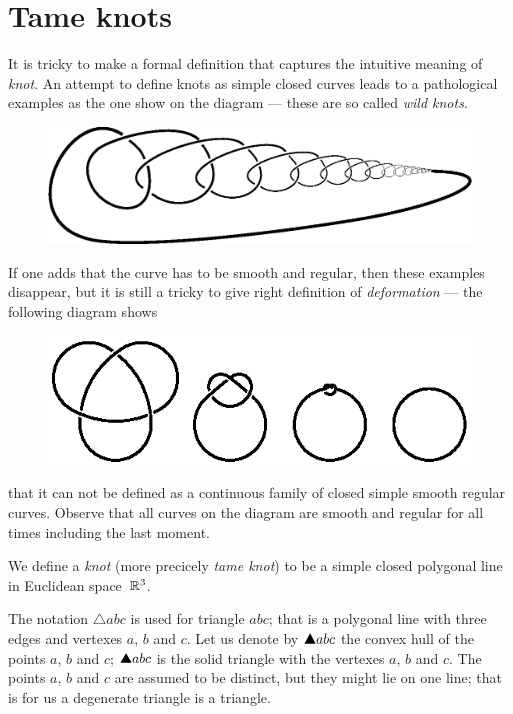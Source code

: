 \section{Tame knots}

It is tricky to make a formal definition that captures the intuitive meaning of \emph{knot}.
An attempt to define knots as simple closed curves leads to a pathological examples as the one show on the diagram --- these are so called \emph{wild knots}.
\begin{figure}[h]
\vskip-0mm
\centering
\includegraphics[scale=.6]{pics/Wild_knot}
\vskip0mm
\end{figure}
If one adds that the curve has to be smooth and regular,
then these examples disappear, but it is still a tricky to give right definition of \emph{deformation} --- the following diagram shows 
\begin{figure}[h]
\vskip-0mm
\centering
\includegraphics[scale=1]{pics/knot}
\vskip0mm
\end{figure}
that it can not be defined as a continuous family of closed simple smooth regular curves. 
Observe that all curves on the diagram are smooth and regular for all times including the last moment.

We define a \emph{knot} (more precicely \emph{tame knot}) to be a simple closed polygonal line in Euclidean space~$\mathbb{R}^3$.

The notation $\triangle abc$ is used for triangle $abc$; that is a polygonal line with three edges and vertexes $a$, $b$ and $c$.
Let us denote by $\solidtriangle abc$ the convex hull of the points $a$, $b$ and $c$; $\solidtriangle abc$ is the solid triangle with the vertexes $a$, $b$ and $c$.
The points $a$, $b$ and $c$ are assumed to be distinct, but they might lie on one line;
that is for us a degenerate triangle is a triangle.

